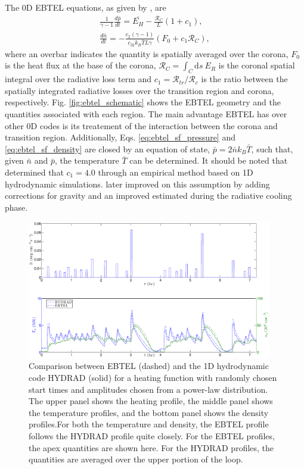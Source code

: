 %
\par The 0D EBTEL equations, as given by \citet{cargill_enthalpy-based_2012}, are
\begin{align}
	\frac{1}{\gamma - 1}\frac{d\bar{p}}{dt} = \bar{E_H} - \frac{\mathcal{R}_C}{L}(1+c_1), \label{eq:ebtel_sf_pressure} \\[0.5em]
	\frac{d\bar{n}}{dt} = -\frac{c_2(\gamma - 1)}{c_32k_B\bar{T}L\gamma}(F_0 + c_1\mathcal{R}_C), \label{eq:ebtel_sf_density}
\end{align}
where an overbar indicates the quantity is spatially averaged over the corona, $F_0$ is the heat flux at the base of the corona, $\mathcal{R}_C=\int_C\mathrm{d}s~E_R$ is the coronal spatial integral over the radiative loss term and $c_1=\mathcal{R}_{tr}/\mathcal{R}_c$ is the ratio between the spatially integrated radiative losses over the transition region and corona, respectively. Fig. \ref{fig:ebtel_schematic} shows the EBTEL geometry and the quantities associated with each region. The main advantage EBTEL has over other 0D codes is its treatement of the interaction between the corona and transition region. Additionally, Eqs. \ref{eq:ebtel_sf_pressure} and \ref{eq:ebtel_sf_density} are closed by an equation of state, $\bar{p}=2\bar{n}k_B\bar{T}$, such that, given $\bar{n}$ and $\bar{p}$, the temperature $\bar{T}$ can be determined. It should be noted that \citet{klimchuk_highly_2008} determined that $c_1=4.0$ through an empirical method based on 1D hydrodynamic simulations. \citet{cargill_enthalpy-based_2012} later improved on this assumption by adding corrections for gravity and an improved estimated during the radiative cooling phase.
%
\begin{figure}
	\centering
	\includegraphics[width=0.95\textwidth]{figures/ebtel_sf_compare.eps}
	\caption{Comparison between EBTEL (dashed) and the 1D hydrodynamic code HYDRAD (solid) for a heating function with randomly chosen start times and amplitudes chosen from a power-law distribution. The upper panel shows the heating profile, the middle panel shows the temperature profiles, and the bottom panel shows the density profiles.For both the temperature and density, the EBTEL profile follows the HYDRAD profile quite closely. For the EBTEL profiles, the apex quantities are shown here. For the HYDRAD profiles, the quantities are averaged over the upper portion of the loop.}
	\label{fig:ebtel_sf_compare}
\end{figure}
